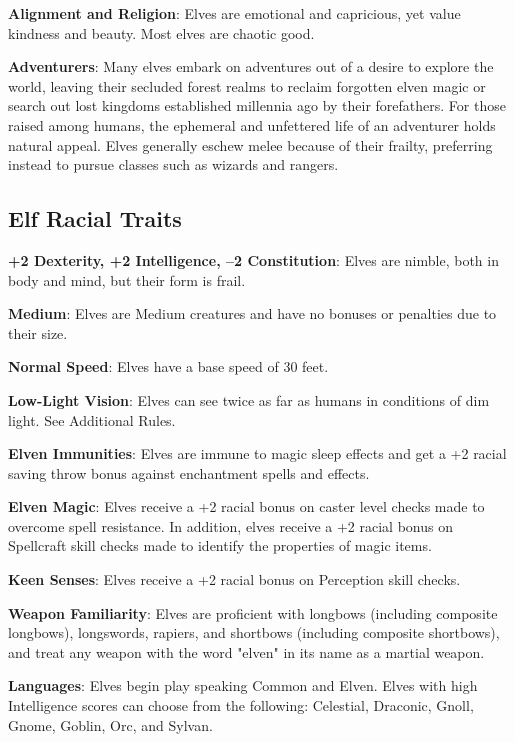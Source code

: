 \textbf{Alignment and Religion}: Elves are emotional and capricious, yet value kindness and beauty. Most elves are chaotic good. 
				
\textbf{Adventurers}: Many elves embark on adventures out of a desire to explore the world, leaving their secluded forest realms to reclaim forgotten elven magic or search out lost kingdoms established millennia ago by their forefathers. For those raised among humans, the ephemeral and unfettered life of an adventurer holds natural appeal. Elves generally eschew melee because of their frailty, preferring instead to pursue classes such as wizards and rangers.
											
\subsection{Elf Racial Traits}

				
\textbf{+2 Dexterity, +2 Intelligence, --2 Constitution}: Elves are nimble, both in body and mind, but their form is frail.
				
\textbf{Medium}: Elves are Medium creatures and have no bonuses or penalties due to their size.
				
\textbf{Normal Speed}: Elves have a base speed of 30 feet.
				
\textbf{Low-Light Vision}: Elves can see twice as far as humans in conditions of dim light. See Additional Rules.
				
\textbf{Elven Immunities}: Elves are immune to magic sleep effects and get a +2 racial saving throw bonus against enchantment spells and effects.
				
\textbf{Elven Magic}: Elves receive a +2 racial bonus on caster level checks made to overcome spell resistance. In addition, elves receive a +2 racial bonus on Spellcraft skill checks made to identify the properties of magic items.
				
\textbf{Keen Senses}: Elves receive a +2 racial bonus on Perception skill checks.
				
\textbf{Weapon Familiarity}: Elves are proficient with longbows (including composite longbows), longswords, rapiers, and shortbows (including composite shortbows), and treat any weapon with the word "elven" in its name as a martial weapon.
				
\textbf{Languages}: Elves begin play speaking Common and Elven. Elves with high Intelligence scores can choose from the following: Celestial, Draconic, Gnoll, Gnome, Goblin, Orc, and Sylvan.
							
